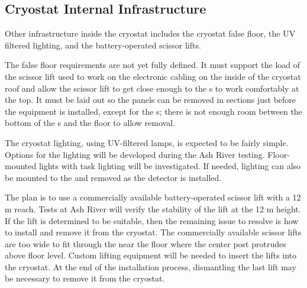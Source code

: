 \subsection{Cryostat Internal Infrastructure}
\label{sec:fdsp-tc-infr-cryo-int}




Other infrastructure inside the cryostat includes the cryostat false floor, the UV filtered lighting, and the battery-operated scissor lifts. 

The false floor %
requirements are not yet fully defined. %
It must support the load of the scissor lift used to work on the electronic cabling on the inside of the cryostat roof and allow the scissor lift to get close enough to the s to work comfortably at the top. 
It  must be laid out so the panels can be removed in sections just before the equipment is installed,  %
except for the s;  there is not enough room between the bottom of the s %
and the floor to allow removal. %

The cryostat lighting, using UV-filtered  lamps, is expected to be fairly simple. Options for the lighting will be developed during the Ash River testing. Floor-mounted lights with task lighting will be investigated. If needed, lighting can also be mounted to the  and removed as the detector is installed.

The plan is to use a commercially available battery-operated scissor lift with a 12 \si{m} reach. Tests at Ash River will verify the stability of the lift at the 12 \si{m} height. If the lift is determined to be suitable, then the remaining issue to resolve is how to install and remove it from the cryostat. The commercially available scissor lifts are too wide to fit through the  near the floor where the center post protrudes above floor level. Custom lifting equipment will be needed to insert the lifts into the cryostat. At the end of the installation process, dismantling the last lift may be necessary to remove it from the cryostat.

\clearpage

